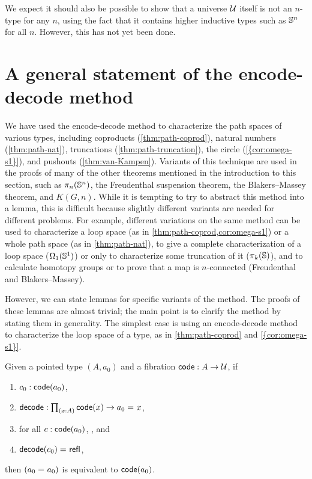 We expect it should also be possible to show that a universe $\mathcal{U}$ itself is not an $n$-type for any $n$, using the fact that it contains higher inductive types such as $\mathbb{S}^n$ for all $n$.
However, this has not yet been done.

\section{A general statement of the encode-decode method}
\label{sec:general-encode-decode}


We have used the encode-decode method to characterize the path spaces
of various types, including coproducts (\cref{thm:path-coprod}), natural
numbers (\cref{thm:path-nat}), truncations (\cref{thm:path-truncation}),
the circle (\cref{{cor:omega-s1}}), and pushouts
(\cref{thm:van-Kampen}).  Variants of this technique are used in the
proofs of many of the other theorems mentioned in the introduction to
this section, such as $\pi_n(\mathbb{S}^n)$, the Freudenthal suspension
theorem, the Blakers--Massey theorem, and $K(G,n)$.  While it is tempting to try to
abstract this method into a lemma, this is difficult because
slightly different variants are needed for different problems.  For
example, different variations on the same method  can be used to
characterize a loop space (as in \cref{thm:path-coprod,cor:omega-s1}) or
a whole path space (as in \cref{thm:path-nat}), to give a complete
characterization of a loop space ($\Omega_1(\mathbb{S} ^1)$) or only to
characterize some truncation of it ($\pi_k(\mathbb{S})$), and to calculate
homotopy groups or to prove that a map is $n$-connected (Freudenthal and
Blakers--Massey).

However, we can state lemmas for specific variants of the method.
The proofs of these lemmas are almost trivial; the main point is to
clarify the method by stating them in generality.  The simplest
case is using an encode-decode method to characterize the loop space of a
type, as in \cref{thm:path-coprod} and \cref{{cor:omega-s1}}.

\begin{lem}
Given a pointed type $(A,a_0)$ and a fibration
$\mathsf{code} : A \to \mathcal{U}$, if 
\begin{enumerate}
\item $c_0 : \mathsf{code}(a_0)$,
\item $\decode : \prd{x:A} \code(x) \to \id{a_0}{x}$,
\item for all $c : \mathsf{code}(a_0)$, , and
\item $\mathsf{decode}(c_0) =_{} \mathsf{refl}_{}$,
\end{enumerate}
then $(a_0 =_{} a_0)$ is equivalent to $\mathsf{code}(a_0)$.
\end{lem}

